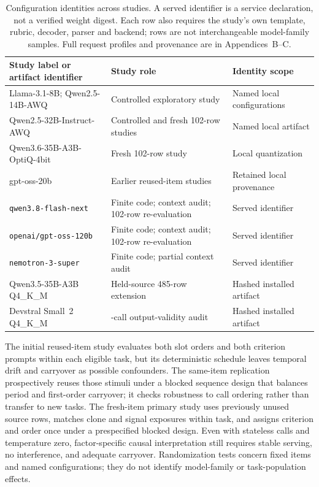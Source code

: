 \documentclass[10pt]{article}
\begin{document}
\begin{table}[t]
\centering\small
\renewcommand{\arraystretch}{1.12}
\caption{Configuration identities across studies. A served identifier is a service declaration, not a verified weight digest. Each row also requires the study's own template, rubric, decoder, parser and backend; rows are not interchangeable model-family samples. Full request profiles and provenance are in Appendices~B--C.}
\label{tab:configuration-overview}
\setlength{\tabcolsep}{4pt}
\begin{tabular}{>{\raggedright\arraybackslash}p{.40\linewidth}>{\raggedright\arraybackslash}p{.32\linewidth}>{\raggedright\arraybackslash}p{.22\linewidth}}
\toprule
Study label or artifact identifier & Study role & Identity scope\\
\midrule
Llama-3.1-8B; Qwen2.5-14B-AWQ & Controlled exploratory study & Named local configurations\\
Qwen2.5-32B-Instruct-AWQ & Controlled and fresh 102-row studies & Named local artifact\\
Qwen3.6-35B-A3B-OptiQ-4bit & Fresh 102-row study & Local quantization\\
gpt-oss-20b & Earlier reused-item studies & Retained local provenance\\
\texttt{qwen3.8-\allowbreak flash-\allowbreak next} & Finite code; context audit; 102-row re-evaluation & Served identifier\\
\texttt{openai/\allowbreak gpt-oss-120b} & Finite code; context audit; 102-row re-evaluation & Served identifier\\
\texttt{nemotron-3-\allowbreak super} & Finite code; partial context audit & Served identifier\\
Qwen3.5-35B-A3B Q4\_K\_M & Held-source 485-row extension & Hashed installed artifact\\
Devstral Small~2 Q4\_K\_M & 612-call output-validity audit & Hashed installed artifact\\
\bottomrule
\end{tabular}
\end{table}

The initial reused-item study evaluates both slot orders and both criterion prompts within each eligible task, but its deterministic schedule leaves temporal drift and carryover as possible confounders. The same-item replication prospectively reuses those stimuli under a blocked sequence design that balances period and first-order carryover; it checks robustness to call ordering rather than transfer to new tasks. The fresh-item primary study uses previously unused source rows, matches clone and signal exposures within task, and assigns criterion and order once under a prespecified blocked design. Even with stateless calls and temperature zero, factor-specific causal interpretation still requires stable serving, no interference, and adequate carryover. Randomization tests concern fixed items and named configurations; they do not identify model-family or task-population effects.
\end{document}
